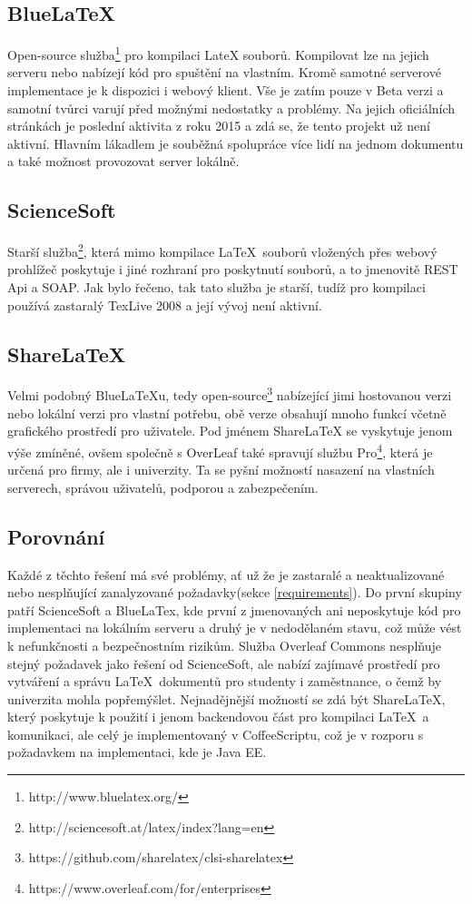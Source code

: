 \subsection{BlueLaTeX}
Open-source služba\footnote{http://www.bluelatex.org/} pro kompilaci LateX souborů. Kompilovat lze na jejich serveru nebo nabízejí kód pro spuštění na vlastním. Kromě samotné serverové implementace je k dispozici i webový klient. Vše je zatím pouze v Beta verzi a samotní tvůrci varují před možnými nedostatky a problémy. Na jejich oficiálních stránkách je poslední aktivita z roku 2015 a zdá se, že tento projekt už není aktivní. Hlavním lákadlem je souběžná spolupráce více lidí na jednom dokumentu a také možnost provozovat server lokálně. 

\subsection{ScienceSoft}
Starší služba\footnote{http://sciencesoft.at/latex/index?lang=en}, která mimo kompilace \LaTeX\ souborů vložených přes webový prohlížeč poskytuje i jiné rozhraní pro poskytnutí souborů, a to jmenovitě REST Api a SOAP. Jak bylo řečeno, tak tato služba je starší, tudíž pro kompilaci používá zastaralý TexLive 2008 a její vývoj není aktivní.

\subsection{ShareLaTeX}
Velmi podobný BlueLaTeXu, tedy open-source\footnote{https://github.com/sharelatex/clsi-sharelatex} nabízející jimi hostovanou verzi nebo lokální verzi pro vlastní potřebu, obě verze obsahují mnoho funkcí včetně grafického prostředí pro uživatele. Pod jménem ShareLaTeX se vyskytuje jenom výše zmíněné, ovšem společně s OverLeaf také spravují službu Pro\footnote{https://www.overleaf.com/for/enterprises}, která je určená pro firmy, ale i univerzity. Ta se pyšní možností nasazení na vlastních serverech, správou uživatelů, podporou a zabezpečením. 

\subsection{Porovnání}
Každé z těchto řešení má své problémy, ať už že je zastaralé a neaktualizované nebo nesplňující zanalyzované požadavky(sekce \ref{requirements}). Do první skupiny patří ScienceSoft a BlueLaTex, kde první z jmenovaných ani neposkytuje kód pro implementaci na lokálním serveru a druhý je v nedodělaném stavu, což může vést k nefunkčnosti a bezpečnostním rizikům. Služba Overleaf Commons nesplňuje stejný požadavek jako řešení od ScienceSoft, ale nabízí zajímavé prostředí pro vytváření a správu \LaTeX\ dokumentů pro studenty i zaměstnance, o čemž by univerzita mohla popřemýšlet. Nejnadějnější možností se zdá být ShareLaTeX, který poskytuje k použití i jenom backendovou část pro kompilaci \LaTeX\ a komunikaci, ale celý je implementovaný v CoffeeScriptu, což je v rozporu s požadavkem na implementaci, kde je Java EE. 

